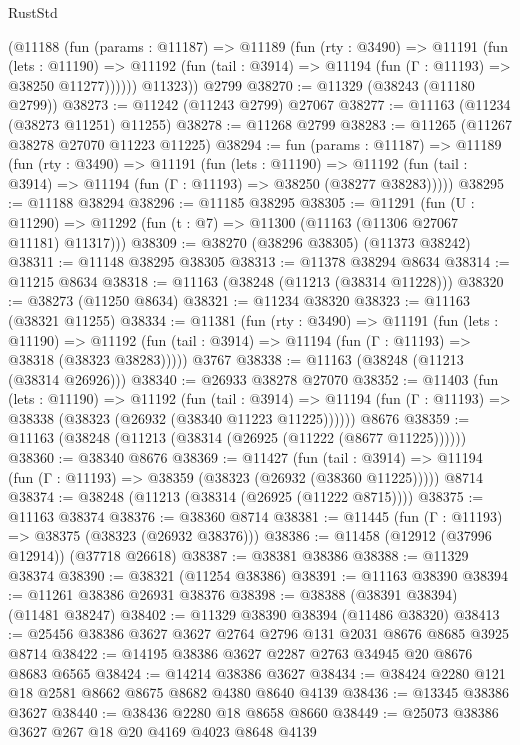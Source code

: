 \begin{lexlean}{RustStd}
\begin{coremodule}
        (@11188
          (fun (params : @11187) =>
          @11189
            (fun (rty : @3490) =>
            @11191
              (fun (lets : @11190) =>
              @11192 (fun (tail : @3914) => @11194 (fun (Γ : @11193) => @38250 @11277))))))
        @11323))
    @2799
@38270 := @11329 (@38243 (@11180 @2799))
@38273 := @11242 (@11243 @2799) @27067
@38277 := @11163 (@11234 (@38273 @11251) @11255)
@38278 := @11268 @2799
@38283 := @11265 (@11267 @38278 @27070 @11223 @11225)
@38294 := fun (params : @11187) =>
  @11189
    (fun (rty : @3490) =>
    @11191
      (fun (lets : @11190) =>
      @11192 (fun (tail : @3914) => @11194 (fun (Γ : @11193) => @38250 (@38277 @38283)))))
@38295 := @11188 @38294
@38296 := @11185 @38295
@38305 := @11291
    (fun (U : @11290) => @11292 (fun (t : @7) => @11300 (@11163 (@11306 @27067 @11181) @11317)))
@38309 := @38270 (@38296 @38305) (@11373 @38242)
@38311 := @11148 @38295 @38305
@38313 := @11378 @38294 @8634
@38314 := @11215 @8634
@38318 := @11163 (@38248 (@11213 (@38314 @11228)))
@38320 := @38273 (@11250 @8634)
@38321 := @11234 @38320
@38323 := @11163 (@38321 @11255)
@38334 := @11381
    (fun (rty : @3490) =>
    @11191
      (fun (lets : @11190) =>
      @11192 (fun (tail : @3914) => @11194 (fun (Γ : @11193) => @38318 (@38323 @38283)))))
    @3767
@38338 := @11163 (@38248 (@11213 (@38314 @26926)))
@38340 := @26933 @38278 @27070
@38352 := @11403
    (fun (lets : @11190) =>
    @11192
      (fun (tail : @3914) =>
      @11194 (fun (Γ : @11193) => @38338 (@38323 (@26932 (@38340 @11223 @11225))))))
    @8676
@38359 := @11163 (@38248 (@11213 (@38314 (@26925 (@11222 (@8677 @11225))))))
@38360 := @38340 @8676
@38369 := @11427
    (fun (tail : @3914) => @11194 (fun (Γ : @11193) => @38359 (@38323 (@26932 (@38360 @11225)))))
    @8714
@38374 := @38248 (@11213 (@38314 (@26925 (@11222 @8715))))
@38375 := @11163 @38374
@38376 := @38360 @8714
@38381 := @11445 (fun (Γ : @11193) => @38375 (@38323 (@26932 @38376)))
@38386 := @11458 (@12912 (@37996 @12914)) (@37718 @26618)
@38387 := @38381 @38386
@38388 := @11329 @38374
@38390 := @38321 (@11254 @38386)
@38391 := @11163 @38390
@38394 := @11261 @38386 @26931 @38376
@38398 := @38388 (@38391 @38394) (@11481 @38247)
@38402 := @11329 @38390 @38394 (@11486 @38320)
@38413 := @25456 @38386 @3627 @3627 @2764 @2796 @131 @2031 @8676 @8685 @3925 @8714
@38422 := @14195 @38386 @3627 @2287 @2763 @34945 @20 @8676 @8683 @6565
@38424 := @14214 @38386 @3627
@38434 := @38424 @2280 @121 @18 @2581 @8662 @8675 @8682 @4380 @8640 @4139
@38436 := @13345 @38386 @3627
@38440 := @38436 @2280 @18 @8658 @8660
@38449 := @25073 @38386 @3627 @267 @18 @20 @4169 @4023 @8648 @4139

\end{coremodule}
\end{lexlean}
